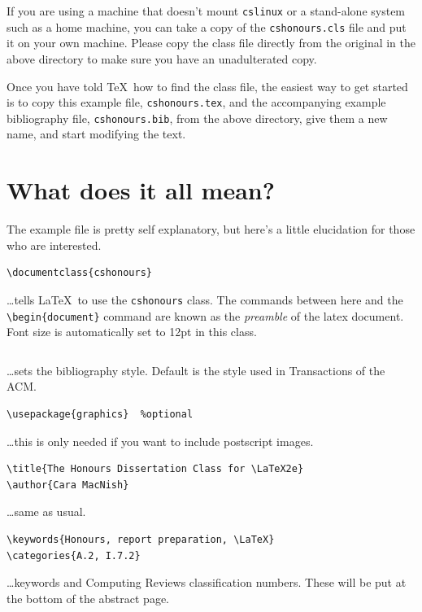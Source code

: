 \documentclass{cshonours}
\begin{document}
If you are using a machine that doesn't mount {\tt cslinux} or a
stand-alone system such as a home machine, you can take a copy of the
{\tt cshonours.cls} file and put it on your own machine. Please copy
the class file directly from the original in the above directory to
make sure you have an unadulterated copy.

Once you have told \TeX\ how to find the class file, the easiest way
to get started is to copy this example file, {\tt cshonours.tex}, and
the accompanying example bibliography file, {\tt cshonours.bib}, from
the above directory, give them a new name, and start modifying the text.

\section{What does it all mean?}
\label{code}

The example file is pretty self explanatory, but here's a little
elucidation for those who are interested.

\begin{verbatim}
\documentclass{cshonours}
\end{verbatim}
\ldots tells \LaTeX\ to use the {\tt cshonours} class. The commands
between here and the \verb!\begin{document}! command are known as the
{\em preamble\/} of the latex document. Font size is automatically set
to 12pt in this class.

\begin{verbatim}

\end{verbatim}
\ldots sets the bibliography style. Default is the style used in
Transactions of the ACM.

\begin{verbatim}
\usepackage{graphics}  %optional
\end{verbatim}
\ldots this is only needed if you want to include postscript images.

\begin{verbatim}
\title{The Honours Dissertation Class for \LaTeX2e}
\author{Cara MacNish}
\end{verbatim}
\ldots same as usual.

\begin{verbatim}
\keywords{Honours, report preparation, \LaTeX}
\categories{A.2, I.7.2}
\end{verbatim}
\ldots keywords and Computing Reviews classification numbers. These
will be put at the bottom of the abstract page.
\end{document}
